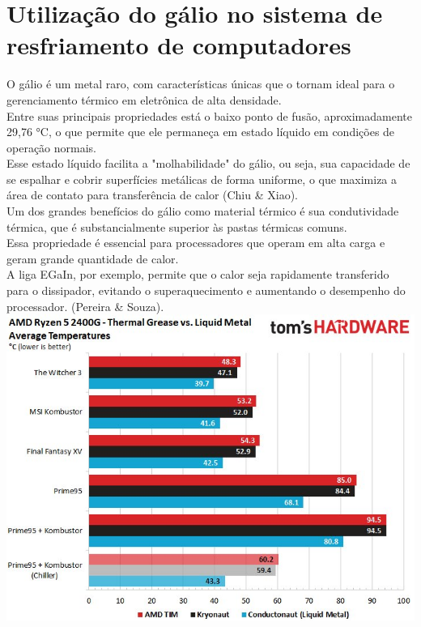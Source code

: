 \documentclass[12pt]{article}
\begin{document}
\section{Utilização do gálio no sistema de resfriamento de computadores}
O gálio é um metal raro, com características únicas que o tornam ideal para o gerenciamento térmico em eletrônica de alta densidade. \\
Entre suas principais propriedades está o baixo ponto de fusão, aproximadamente 29,76 °C, o que permite que ele permaneça em estado líquido em condições de operação normais. \\
Esse estado líquido facilita a "molhabilidade" do gálio, ou seja, sua capacidade de se espalhar e cobrir superfícies metálicas de forma uniforme, o que maximiza a área de contato para transferência de calor (Chiu \& Xiao).\\
Um dos grandes benefícios do gálio como material térmico é sua condutividade térmica, que é substancialmente superior às pastas térmicas comuns. \\
Essa propriedade é essencial para processadores que operam em alta carga e geram grande quantidade de calor. \\
A liga EGaIn, por exemplo, permite que o calor seja rapidamente transferido para o dissipador, evitando o superaquecimento e aumentando o desempenho do processador. (Pereira \& Souza).\\
\begin{adjustbox}{center,caption={Grafico Comparativo entre Pasta térmica e Metal liquido (Imagem: Tom's Hardware)},nofloat=figure,vspace=\bigskipamount}
    \includegraphics[width=15cm]{tio_hardware.jpg}
\end{adjustbox}
\end{document}
